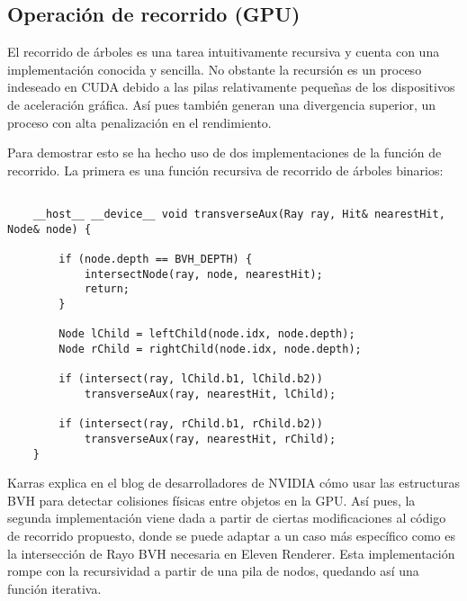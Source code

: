 \subsection{Operación de recorrido (GPU)}
	
El recorrido de árboles es una tarea intuitivamente recursiva y cuenta con una implementación conocida y sencilla. No obstante la recursión es un proceso indeseado en CUDA debido a las pilas relativamente pequeñas de los dispositivos de aceleración gráfica. Así pues también generan una divergencia superior, un proceso con alta penalización en el rendimiento.

Para demostrar esto se ha hecho uso de dos implementaciones de la función de recorrido. La primera es una función recursiva de recorrido de árboles binarios:

\begin{minipage}[c]{0.95\textwidth}
\begin{lstlisting}[label={cod:bvhtransversalrec}, caption={Recorrido del árbol BVH recursivo}]
	
	__host__ __device__ void transverseAux(Ray ray, Hit& nearestHit, Node& node) {
	
		if (node.depth == BVH_DEPTH) {
			intersectNode(ray, node, nearestHit);
			return;
		}
	
		Node lChild = leftChild(node.idx, node.depth);
		Node rChild = rightChild(node.idx, node.depth);
	
		if (intersect(ray, lChild.b1, lChild.b2))
			transverseAux(ray, nearestHit, lChild);
		
		if (intersect(ray, rChild.b1, rChild.b2))
			transverseAux(ray, nearestHit, rChild);		
	}

\end{lstlisting}
\end{minipage}
	
Karras explica en el blog de desarrolladores de NVIDIA \cite{karrastransversal} cómo usar las estructuras BVH para detectar colisiones físicas entre objetos en la GPU. Así pues, la segunda implementación viene dada a partir de ciertas modificaciones al código de recorrido propuesto, donde se puede adaptar a un caso más específico como es la intersección de Rayo \- BVH necesaria en Eleven Renderer. Esta implementación rompe con la recursividad a partir de una pila de nodos, quedando así una función iterativa.

